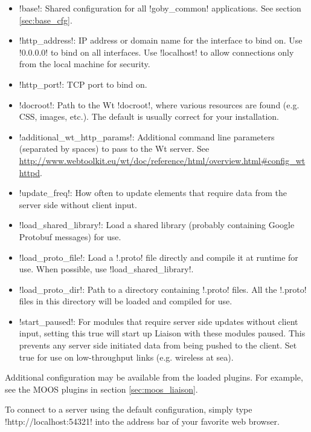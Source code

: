 \begin{itemize}
\item !base!: Shared configuration for all !goby_common! applications. See section \ref{sec:base_cfg}.
\item !http_address!: IP address or domain name for the interface to bind on. Use !0.0.0.0! to bind on all interfaces. Use !localhost! to allow connections only from the local machine for security.
\item !http_port!: TCP port to bind on.
\item !docroot!: Path to the Wt !docroot!, where various resources are found (e.g. CSS, images, etc.). The default is usually correct for your installation.
\item !additional_wt_http_params!: Additional command line parameters (separated by spaces) to pass to the Wt server. See \url{http://www.webtoolkit.eu/wt/doc/reference/html/overview.html#config_wthttpd}.
\item !update_freq!: How often to update elements that require data from the server side without client input.
\item !load_shared_library!: Load a shared library (probably containing Google Protobuf messages) for use.
\item !load_proto_file!: Load a !.proto! file directly and compile it at runtime for use. When possible, use !load_shared_library!.
\item !load_proto_dir!: Path to a directory containing !.proto! files. All the !.proto! files in this directory will be loaded and compiled for use.
\item !start_paused!: For modules that require server side updates without client input, setting this true will start up Liaison with these modules paused. This prevents any server side initiated data from being pushed to the client. Set true for use on low-throughput links (e.g. wireless at sea).
\end{itemize}

Additional configuration may be available from the loaded plugins. For example, see the MOOS plugins in section \ref{sec:moos_liaison}.

To connect to a server using the default configuration, simply type !http://localhost:54321! into the address bar of your favorite web browser.
